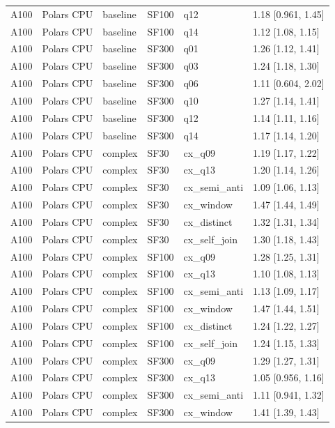 \begin{longtable}{llllll}
A100 & Polars CPU & baseline & SF100 & q12 & 1.18 [0.961, 1.45] \\
A100 & Polars CPU & baseline & SF100 & q14 & 1.12 [1.08, 1.15] \\
A100 & Polars CPU & baseline & SF300 & q01 & 1.26 [1.12, 1.41] \\
A100 & Polars CPU & baseline & SF300 & q03 & 1.24 [1.18, 1.30] \\
A100 & Polars CPU & baseline & SF300 & q06 & 1.11 [0.604, 2.02] \\
A100 & Polars CPU & baseline & SF300 & q10 & 1.27 [1.14, 1.41] \\
A100 & Polars CPU & baseline & SF300 & q12 & 1.14 [1.11, 1.16] \\
A100 & Polars CPU & baseline & SF300 & q14 & 1.17 [1.14, 1.20] \\
A100 & Polars CPU & complex & SF30 & cx\_q09 & 1.19 [1.17, 1.22] \\
A100 & Polars CPU & complex & SF30 & cx\_q13 & 1.20 [1.14, 1.26] \\
A100 & Polars CPU & complex & SF30 & cx\_semi\_anti & 1.09 [1.06, 1.13] \\
A100 & Polars CPU & complex & SF30 & cx\_window & 1.47 [1.44, 1.49] \\
A100 & Polars CPU & complex & SF30 & cx\_distinct & 1.32 [1.31, 1.34] \\
A100 & Polars CPU & complex & SF30 & cx\_self\_join & 1.30 [1.18, 1.43] \\
A100 & Polars CPU & complex & SF100 & cx\_q09 & 1.28 [1.25, 1.31] \\
A100 & Polars CPU & complex & SF100 & cx\_q13 & 1.10 [1.08, 1.13] \\
A100 & Polars CPU & complex & SF100 & cx\_semi\_anti & 1.13 [1.09, 1.17] \\
A100 & Polars CPU & complex & SF100 & cx\_window & 1.47 [1.44, 1.51] \\
A100 & Polars CPU & complex & SF100 & cx\_distinct & 1.24 [1.22, 1.27] \\
A100 & Polars CPU & complex & SF100 & cx\_self\_join & 1.24 [1.15, 1.33] \\
A100 & Polars CPU & complex & SF300 & cx\_q09 & 1.29 [1.27, 1.31] \\
A100 & Polars CPU & complex & SF300 & cx\_q13 & 1.05 [0.956, 1.16] \\
A100 & Polars CPU & complex & SF300 & cx\_semi\_anti & 1.11 [0.941, 1.32] \\
A100 & Polars CPU & complex & SF300 & cx\_window & 1.41 [1.39, 1.43] \\

\end{longtable}

